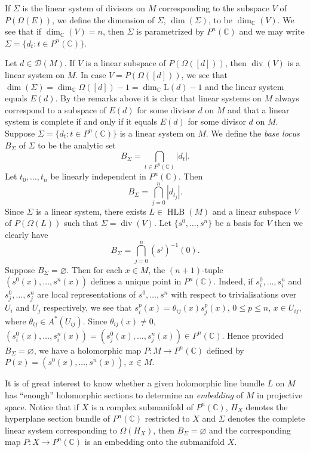 If $\Sigma$ is the linear system of divisors on $M$ corresponding to the subspace $V$ of $P(\Omega(E))$, we define the dimension of $\Sigma$, $\dim(\Sigma)$, to be $\dim_{\mathbb C}(V)$. We see that if $\dim_{\mathbb C}(V)=n$, then $\Sigma$ is parametrized by $P^n(\mathbb C)$ and we may write $\Sigma=\{d_t:t\in P^n(\mathbb C)\}$.

Let $d\in\mathcal D(M)$. If $V$ is a linear subspace of $P(\Omega([d]))$, then $\operatorname{div}(V)$ is a linear system on $M$. In case $V=P(\Omega([d]))$, we see that $\dim(\Sigma)=\dim_{\mathbb C}\Omega([d])-1=\dim_{\mathbb C}\mathrm L(d)-1$ and the linear system equals $E(d)$. By the remarks above it is clear that linear systems on $M$ always correspond to a subspace of $E(d)$ for some divisor $d$ on $M$ and that a linear system is complete if and only if it equals $E(d)$ for some divisor $d$ on $M$.
Suppose $\Sigma=\{d_t:t\in P^n(\mathbb C)\}$ is a linear system on $M$. We define the \emph{base locus} $B_\Sigma$ of $\Sigma$ to be the analytic set
\[B_\Sigma=\bigcap_{t\in P^n(\mathbb C)}|d_t|.\]
Let $t_0,\ldots,t_n$ be linearly independent in $P^n(\mathbb C)$. Then
\[B_\Sigma=\bigcap_{j=0}^n|d_{t_j}|.\]
Since $\Sigma$ is a linear system, there exists $L\in\operatorname{HLB}(M)$ and a linear subspace $V$ of $P(\Omega(L))$ such that $\Sigma=\operatorname{div}(V)$. Let $\{s^0,\ldots,s^n\}$ be a basis for $V$ then we clearly have
\[B_\Sigma=\bigcap_{j=0}^n(s^j)^{-1}(0).\]
Suppose $B_\Sigma=\varnothing$. Then for each $x\in M$, the $(n+1)$-tuple $(s^0(x),\ldots,s^n(x))$ defines a unique point in $P^n(\mathbb C)$. Indeed, if $s_i^0,\ldots,s_i^n$ and $s_j^0,\ldots,s_j^n$ are local representations of $s^0,\ldots,s^n$ with respect to trivialisations over $U_i$ and $U_j$ respectively, we see that $s_i^p(x)=\theta_{ij}(x)s_j^p(x)$, $0\leq p\leq n$, $x\in U_{ij}$, where $\theta_{ij}\in A^*(U_{ij})$. Since $\theta_{ij}(x)\neq0$, $(s_i^0(x),\ldots,s_i^n(x))=(s_j^0(x),\ldots,s_j^n(x))\in P^n(\mathbb C)$. Hence provided $B_\Sigma=\varnothing$, we have a holomorphic map $P:M\to P^n(\mathbb C)$ defined by $P(x)=(s^0(x),\ldots,s^n(x))$, $x\in M$.

It is of great interest to know whether a given holomorphic line bundle $L$ on $M$ has ``enough'' holomorphic sections to determine an \emph{embedding} of $M$ in projective space. Notice that if $X$ is a complex submanifold of $P^n(\mathbb C)$, $H_X$ denotes the hyperplane section bundle of $P^n(\mathbb C)$ restricted to $X$ and $\Sigma$ denotes the complete linear system corresponding to $\Omega(H_X)$, then $B_\Sigma=\varnothing$ and the corresponding map $P:X\to P^n(\mathbb C)$ is an embedding onto the submanifold $X$.

